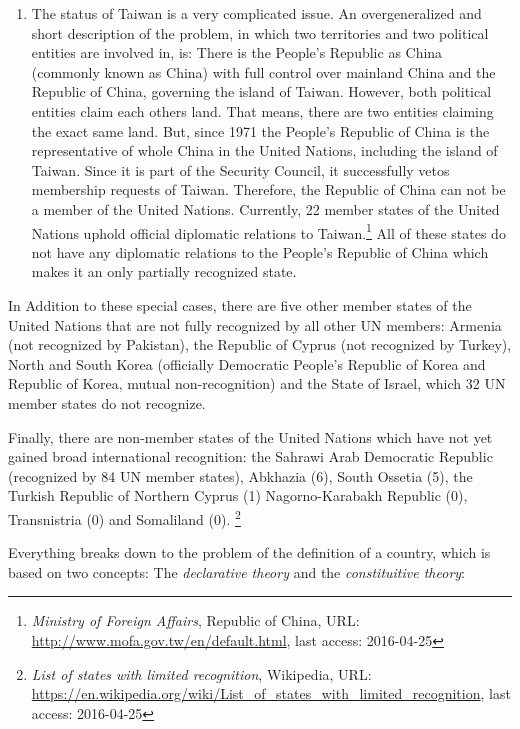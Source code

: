 \begin{enumerate}
  \item The status of Taiwan is a very complicated issue. An overgeneralized and short description of the problem, in which two territories and two political entities are involved in, is: There is the People's Republic as China (commonly known as China) with full control over mainland China and the Republic of China, governing the island of Taiwan. However, both political entities claim each others land. That means, there are two entities claiming the exact same land. But, since 1971 the People's Republic of China is the representative of whole China in the United Nations, including the island of Taiwan. Since it is part of the Security Council, it successfully vetos membership requests of Taiwan. Therefore, the Republic of China can not be a member of the United Nations. Currently, 22 member states of the United Nations uphold official diplomatic relations to Taiwan.\footnote{\textit{Ministry of Foreign Affairs}, Republic of China, URL: \url{http://www.mofa.gov.tw/en/default.html}, last access: 2016-04-25}
  All of these states do not have any diplomatic relations to the People's Republic of China which makes it an only partially recognized state.

\end{enumerate}

In Addition to these special cases, there are five other member states of the United Nations that are not fully recognized by all other UN members: Armenia (not recognized by Pakistan), the Republic of Cyprus (not recognized by Turkey), North and South Korea (officially Democratic People's Republic of Korea and Republic of Korea, mutual non-recognition) and the State of Israel, which 32 UN member states do not recognize.

Finally, there are non-member states of the United Nations which have not yet gained broad international recognition: the Sahrawi Arab Democratic Republic (recognized by 84 UN member states), Abkhazia (6), South Ossetia (5), the Turkish Republic of Northern Cyprus (1) Nagorno-Karabakh Republic (0), Transnistria (0) and Somaliland (0).
\footnote{\textit{List of states with limited recognition}, Wikipedia, URL: \url{https://en.wikipedia.org/wiki/List_of_states_with_limited_recognition}, last access: 2016-04-25}

Everything breaks down to the problem of the definition of a country, which is based on two concepts: The \emph{declarative theory} and the \emph{constituitive theory}:


